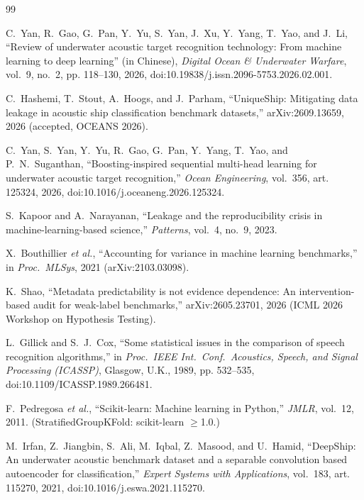 ﻿\documentclass[journal]{IEEEtran}
\begin{document}
{\footnotesize
\begin{thebibliography}{99}

C.~Yan, R.~Gao, G.~Pan, Y.~Yu, S.~Yan, J.~Xu, Y.~Yang, T.~Yao, and J.~Li, ``Review of underwater
acoustic target recognition technology: From machine learning to deep learning'' (in Chinese),
\emph{Digital Ocean \& Underwater Warfare}, vol.~9, no.~2, pp. 118--130, 2026,
doi:10.19838/j.issn.2096-5753.2026.02.001.

C.~Hashemi, T.~Stout, A.~Hoogs, and J.~Parham, ``UniqueShip: Mitigating data leakage in acoustic
ship classification benchmark datasets,'' arXiv:2609.13659, 2026 (accepted, OCEANS 2026).

C.~Yan, S.~Yan, Y.~Yu, R.~Gao, G.~Pan, Y.~Yang, T.~Yao, and P.~N.~Suganthan,
``Boosting-inspired sequential multi-head learning for underwater acoustic target recognition,''
\emph{Ocean Engineering}, vol.~356, art. 125324, 2026, doi:10.1016/j.oceaneng.2026.125324.

S.~Kapoor and A.~Narayanan, ``Leakage and the reproducibility crisis in machine-learning-based
science,'' \emph{Patterns}, vol.~4, no.~9, 2023.

X.~Bouthillier \emph{et al.}, ``Accounting for variance in machine learning benchmarks,'' in
\emph{Proc.\ MLSys}, 2021 (arXiv:2103.03098).

K.~Shao, ``Metadata predictability is not evidence dependence: An intervention-based audit for
weak-label benchmarks,'' arXiv:2605.23701, 2026 (ICML 2026 Workshop on Hypothesis Testing).

L.~Gillick and S.~J.~Cox, ``Some statistical issues in the comparison of speech recognition
algorithms,'' in \emph{Proc.\ IEEE Int.\ Conf.\ Acoustics, Speech, and Signal Processing
(ICASSP)}, Glasgow, U.K., 1989, pp. 532--535, doi:10.1109/ICASSP.1989.266481.

F.~Pedregosa \emph{et al.}, ``Scikit-learn: Machine learning in Python,'' \emph{JMLR}, vol.~12,
2011. (StratifiedGroupKFold: scikit-learn $\ge$1.0.)

M.~Irfan, Z.~Jiangbin, S.~Ali, M.~Iqbal, Z.~Masood, and U.~Hamid, ``DeepShip: An underwater
acoustic benchmark dataset and a separable convolution based autoencoder for classification,''
\emph{Expert Systems with Applications}, vol.~183, art. 115270, 2021,
doi:10.1016/j.eswa.2021.115270.


\end{thebibliography}}
\end{document}
